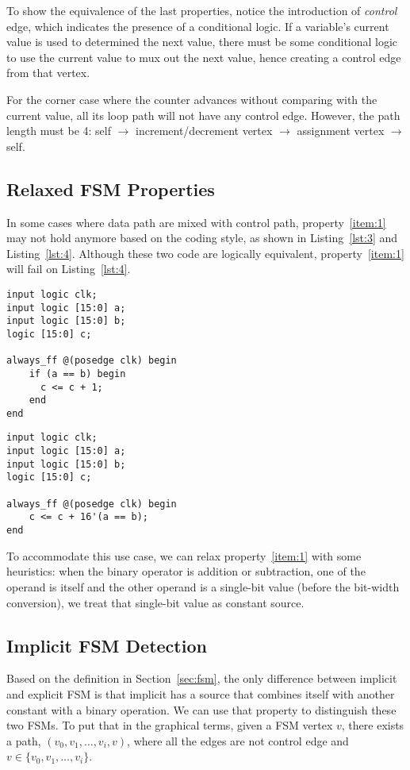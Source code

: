 \documentclass{article}
\begin{document}
To show the equivalence of the last properties, notice the introduction of \textit{control}
edge, which indicates the presence of a conditional logic. If a variable's current value
is used to determined the next value, there must be some conditional logic to use the
current value to mux out the next value, hence creating a control edge from that vertex.

For the corner case where the counter advances without comparing with the current
value, all its loop path will not have any control edge. However, the path length
must be 4: self $\rightarrow$ increment/decrement vertex $\rightarrow$ assignment vertex
$\rightarrow$ self.

\subsection{Relaxed FSM Properties}
In some cases where data path are mixed with control path, property~\ref{item:1} may not
hold anymore based on the coding style, as shown in Listing~\ref{lst:3} and Listing~\ref{lst:4}. Although these
two code are logically equivalent, property~\ref{item:1} will fail on Listing~\ref{lst:4}.

\begin{lstlisting}[style={verilog-style}, caption={Conditional increment counter
    with constant source},
    label={lst:3}]
input logic clk;
input logic [15:0] a;
input logic [15:0] b;
logic [15:0] c;

always_ff @(posedge clk) begin
    if (a == b) begin
      c <= c + 1;
    end
end
\end{lstlisting}

\begin{lstlisting}[style={verilog-style}, caption={Conditional increment counter
    with constant source},
    label={lst:4}]
input logic clk;
input logic [15:0] a;
input logic [15:0] b;
logic [15:0] c;

always_ff @(posedge clk) begin
    c <= c + 16'(a == b);
end
\end{lstlisting}

To accommodate this use case, we can relax property~\ref{item:1} with some heuristics:
when the binary operator is addition or subtraction, one of the operand is itself and the
other operand is a single-bit value (before the bit-width conversion), we treat that
single-bit value as constant source.

\subsection{Implicit FSM Detection}
Based on the definition in Section~\ref{sec:fsm}, the only difference between implicit and
explicit FSM is that implicit has a source that combines itself with another constant with
a binary operation. We can use that property to distinguish these two FSMs. To put that
in the graphical terms, given a FSM vertex $v$, there exists a path,
$(v_0, v_1, \dots, v_i, v)$, where all the edges are not control edge and
$v \in \{v_0, v_1, \dots, v_i\}$.
\end{document}
